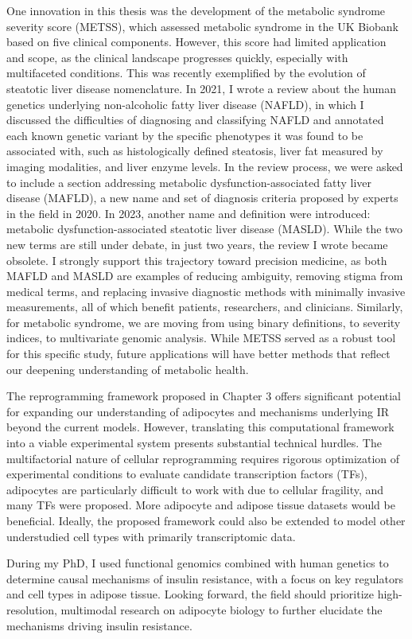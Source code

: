 \begin{dissertationepilogue}
    One innovation in this thesis was the development of the metabolic syndrome severity score (METSS), which assessed metabolic syndrome in the UK Biobank based on five clinical components. However, this score had limited application and scope, as the clinical landscape progresses quickly, especially with multifaceted conditions. This was recently exemplified by the evolution of steatotic liver disease nomenclature. In 2021, I wrote a review about the human genetics underlying non-alcoholic fatty liver disease (NAFLD), in which I discussed the difficulties of diagnosing and classifying NAFLD and annotated each known genetic variant by the specific phenotypes it was found to be associated with, such as histologically defined steatosis, liver fat measured by imaging modalities, and liver enzyme levels\cite{Du2021-bq}. In the review process, we were asked to include a section addressing metabolic dysfunction-associated fatty liver disease (MAFLD), a new name and set of diagnosis criteria proposed by experts in the field in 2020\cite{Eslam2020-ud}. In 2023, another name and definition were introduced: metabolic dysfunction-associated steatotic liver disease (MASLD)\cite{Rinella2023-oe}. While the two new terms are still under debate\cite{Ramirez-Mejia2024-jo}, in just two years, the review I wrote became obsolete. I strongly support this trajectory toward precision medicine, as both MAFLD and MASLD are examples of reducing ambiguity, removing stigma from medical terms, and replacing invasive diagnostic methods with minimally invasive measurements, all of which benefit patients, researchers, and clinicians. Similarly, for metabolic syndrome, we are moving from using binary definitions\cite{Kraja2011-ja}, to severity indices\cite{Gurka2014-ib}, to multivariate genomic analysis\cite{Park2024-da}. While METSS served as a robust tool for this specific study, future applications will have better methods that reflect our deepening understanding of metabolic health.
    
    The reprogramming framework proposed in Chapter 3 offers significant potential for expanding our understanding of adipocytes and mechanisms underlying IR beyond the current models. However, translating this computational framework into a viable experimental system presents substantial technical hurdles. The multifactorial nature of cellular reprogramming requires rigorous optimization of experimental conditions to evaluate candidate transcription factors (TFs), adipocytes are particularly difficult to work with due to cellular fragility, and many TFs were proposed. More adipocyte and adipose tissue datasets would be beneficial. Ideally, the proposed framework could also be extended to model other understudied cell types with primarily transcriptomic data.
    
    During my PhD, I used functional genomics combined with human genetics to determine causal mechanisms of insulin resistance, with a focus on key regulators and cell types in adipose tissue.  Looking forward, the field should prioritize high-resolution, multimodal research on adipocyte biology to further elucidate the mechanisms driving insulin resistance. 

\end{dissertationepilogue}


